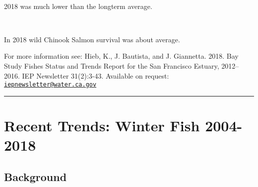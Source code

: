 \documentclass[
]{book}
\begin{document}
\begin{panel-grid}
\begin{columns-nocenter}
\begin{column800}
\end{column800}

\begin{column40}

~

\end{column40}

\begin{column800}

2018 was much lower than the longterm average.

\end{column800}

\begin{column40}

~

\end{column40}

\begin{column800}

In 2018 wild Chinook Salmon survival was about average.

\end{column800}

\end{columns-nocenter}

\end{panel-grid}

\begin{disclaimer}
For more information see: Hieb, K., J. Bautista, and J. Giannetta. 2018.
Bay Study Fishes Status and Trends Report for the San Francisco Estuary,
2012--2016. IEP Newsletter 31(2):3-43. Available on request:
\href{mailto:iepnewsletter@water.ca.gov}{\nolinkurl{iepnewsletter@water.ca.gov}}
\end{disclaimer}

\begin{center}\rule{0.5\linewidth}{0.5pt}\end{center}

\hypertarget{recent-trends-winter-fish-2004-2018}{%
\section{Recent Trends: Winter Fish 2004-2018}\label{recent-trends-winter-fish-2004-2018}}

\hypertarget{background-5}{%
\subsection{Background}\label{background-5}}
\end{document}
